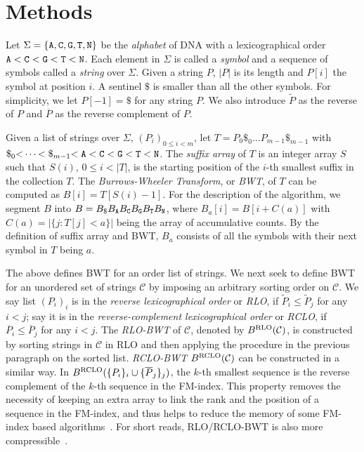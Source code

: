 \documentclass{bioinfo}
\begin{document}
\section{Methods}
\begin{methods}
Let $\Sigma=\{{\tt A},{\tt C},{\tt G},{\tt T},{\tt N}\}$ be the \emph{alphabet}
of DNA with a lexicographical order
${\tt A\char60C\char60G\char60T\char60N}$. Each element in $\Sigma$ is
called a \emph{symbol} and a sequence of symbols called a \emph{string} over
$\Sigma$. Given a string $P$, $|P|$ is its length and $P[i]$ the symbol at
position $i$. A sentinel $\$$ is smaller
than all the other symbols. For simplicity, we let $P[-1]=\$$ for any string
$P$. We also introduce $\widetilde{P}$ as the reverse of $P$ and
$\overline{P}$ as the reverse complement of $P$.

Given a list of strings over $\Sigma$, $(P_i)_{0\le i<m}$, let
$T=P_0\$_0\ldots P_{m-1}\$_{m-1}$ with
${\tt\char36}_0{\tt\char60}\cdots{\char60\tt\char36}_{m-1}{\tt\char60A\char60C\char60G\char60T\char60N}$.
The \emph{suffix array} of $T$ is an integer array $S$ such that $S(i)$,
\mbox{$0\le i<|T|$}, is the starting position of the $i$-th smallest suffix in
the collection $T$. The \emph{Burrows-Wheeler Transform}, or \emph{BWT}, of $T$
can be computed as \mbox{$B[i]=T[S(i)-1]$}. For the description of the
algorithm, we segment $B$ into \mbox{$B=B_{\tt\$}B_{\tt A}B_{\tt C}B_{\tt
G}B_{\tt T}B_{\tt N}$}, where \mbox{$B_a[i]=B[i+C(a)]$} with
\mbox{$C(a)=|\{j:T[j]<a\}|$} being the array of accumulative counts. By the
definition of suffix array and BWT, $B_a$ consists of all the symbols with
their next symbol in $T$ being $a$.

The above defines BWT for an order list of strings. We next seek to define BWT
for an unordered set of strings $\mathcal{C}$ by imposing an arbitrary sorting
order on $\mathcal{C}$.  We say list $(P_i)_i$ is in the \emph{reverse
lexicographical order} or \emph{RLO}, if $\widetilde{P}_i\le\widetilde{P}_j$
for any $i<j$; say it is in the \emph{reverse-complement lexicographical order}
or \emph{RCLO}, if $\overline{P}_i\le\overline{P}_j$ for any $i<j$.
The \emph{RLO-BWT} of $\mathcal{C}$, denoted by $B^{\rm RLO}(\mathcal{C})$,
is constructed by sorting strings in $\mathcal{C}$ in RLO and then applying
the procedure in the previous paragraph on the sorted list. \emph{RCLO-BWT}
$B^{\rm RCLO}(\mathcal{C})$ can be constructed in a similar way. In
$B^{\rm RCLO}(\{P_i\}_i\cup\{\overline{P}_j\}_j)$, the $k$-th smallest
sequence is the reverse complement of the $k$-th sequence in the FM-index. This
property removes the necessity of keeping an extra array to link the rank and
the position of a sequence in the FM-index, and thus helps to reduce the memory
of some FM-index based algorithms~\citep{Simpson:2012aa}. For short reads, RLO/RCLO-BWT
is also more compressible~\citep{Cox:2012ly}.


\end{methods}
\end{document}

